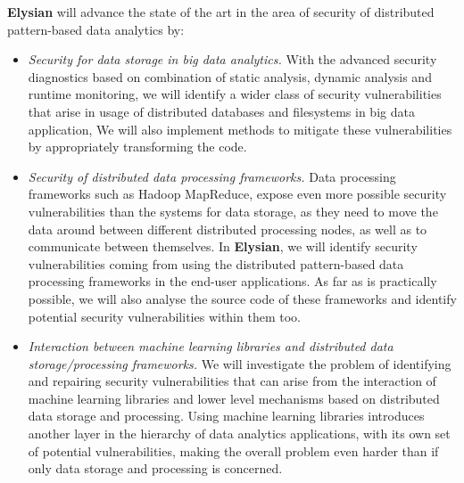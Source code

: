 \documentclass[a4paper,11pt]{article}
\newcommand{\project}[1]{\textbf{#1}\xspace}
\newcommand{\SECURITY}{\project{Elysian}}
\newcommand{\TheProject}{\SECURITY}
\begin{document}
\begin{mdframed}[backgroundcolor=gray!10]
\TheProject{} will advance the state of the art in the area of 
security of distributed pattern-based data analytics by:
\begin{itemize}
\item \emph{Security for data storage in big data analytics.} With the advanced security diagnostics based on combination of static analysis, dynamic analysis and runtime monitoring, we will identify a wider class of security vulnerabilities that arise in usage of distributed databases and filesystems in big data application, We will also implement methods to mitigate these vulnerabilities by appropriately transforming the code.
\item \emph{Security of distributed data processing frameworks.} Data processing frameworks such as Hadoop MapReduce, expose even more possible security vulnerabilities than the systems for data storage, as they need to move the data around between different distributed processing nodes, as well as to communicate between themselves. In \TheProject{}, we will identify security vulnerabilities coming from using the distributed pattern-based data processing frameworks in the end-user applications. As far as is practically possible, we will also analyse the source code of these frameworks and identify potential security vulnerabilities within them too.
\item \emph{Interaction between machine learning libraries and distributed data storage/processing frameworks.} We will investigate the problem of identifying and repairing security vulnerabilities that can arise from the interaction of machine learning libraries and lower level mechanisms based on distributed data storage and processing. Using machine learning libraries introduces another layer in the hierarchy of data analytics applications, with its own set of potential vulnerabilities, making the overall problem even harder than if only data storage and processing is concerned. 
\end{itemize}
\end{mdframed}
\end{document}
